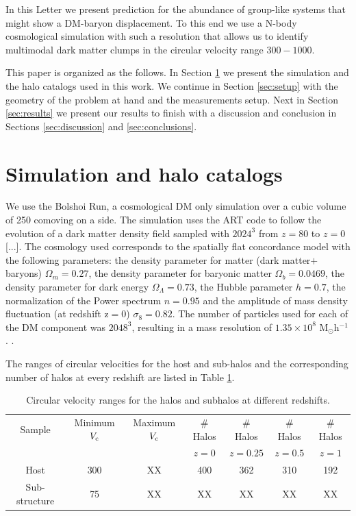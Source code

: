 \documentclass{emulateapj}
\newcommand{\hMpc}{{\ifmmode{h^{-1}{\rm Mpc}}\else{$h^{-1}$Mpc }\fi}}
\newcommand{\kms}{{\ifmmode{{\mathrm{\,km\ s}^{-1}}}\else{\,km~s$^{-1}$}\fi}}
\begin{document}
In this Letter we present prediction for the abundance of group-like
systems that might show a DM-baryon displacement. To this end we use a
N-body cosmological simulation with such a resolution that allows us
to identify multimodal dark matter clumps in the circular velocity
range $300-1000$\kms. 

This paper is organized as the follows. In Section
\ref{sec:simulation} we present the simulation and the halo catalogs
used in this work. We continue in Section \ref{sec:setup} with the
geometry of the problem at hand and the measurements setup. Next in
Section \ref{sec:results} we present our results to finish with a
discussion and conclusion in Sections \ref{sec:discussion} and
\ref{sec:conclusions}. 


\section{Simulation and halo catalogs}
\label{sec:simulation}

We use the Bolshoi Run, a cosmological DM only simulation over a cubic
volume of 250 comoving \hMpc on a side. The simulation uses the ART code to
follow the evolution of  a dark matter density field sampled with
$2024^3$ from $z=80$ to $z=0$ [...]. The cosmology used  corresponds
to  the spatially flat concordance model with the following
parameters:  the density parameter for matter (dark matter$+$baryons)
$\Omega_m=0.27$, the density parameter for baryonic matter
$\Omega_b=0.0469$, the density parameter for dark energy
$\Omega_{\Lambda}=0.73$, the Hubble parameter $h=0.7$, the
normalization of the Power spectrum $n=0.95$ and the amplitude of mass
density fluctuation (at redshift z$=$0) $\sigma_8=0.82$.  The number
of particles used for each of the DM component was $2048^3$, resulting
in a mass resolution of $1.35 \times 10^8$
M$_{\odot}$h$^{-1}$. \citet{2011ApJ...740..102K}.  


The ranges of circular velocities for the host and sub-halos and the
corresponding number of halos at every redshift are listed in Table
\ref{table1}. 



\begin{table}
\begin{center}
\begin{tabular}{ccccccc}\hline\hline
Sample  & Minimum $V_{\rm c}$ & Maximum $V_{\rm c}$  & \# Halos & \#
Halos  & \# Halos & \# Halos \\ 
 & \kms    & \kms  &   $z=0$   & $z=0.25$  & $z=0.5$  & $z=1$  \\\hline
Host   & 300 & XX &    400    &   362     &   310    &  192   \\ 
Sub-structure & 75  & XX &    XX   &   XX     &   XX    &  XX   \\\hline
\end{tabular} 
\caption{Circular velocity ranges for the halos and subhalos at
  different redshifts.}  
\label{table1}
\end{center}
\end{table}
\end{document}
